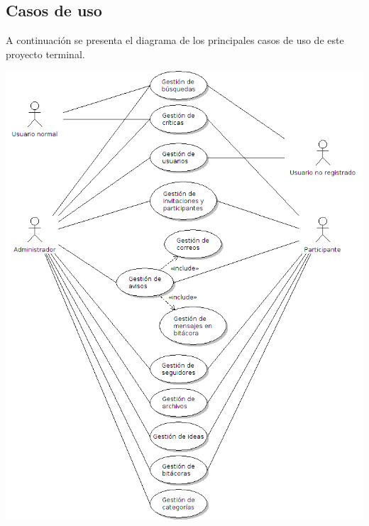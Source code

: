 \documentclass[12pt,letterpaper,titlepage]{article}
\begin{document}
\subsection{Casos de uso}
A continuaci\'on se presenta el diagrama de los principales casos de uso de este proyecto terminal.
\begin{center}
\includegraphics[width=390pt]{casos1.png}
\end{center}
\end{document}

